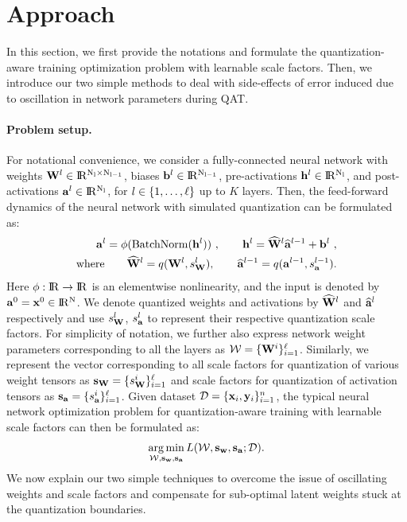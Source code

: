 
\section{Approach}
\label{sec:approach}
In this section, we first provide the notations and formulate the quantization-aware training optimization problem with learnable scale factors. Then, we introduce our two simple methods to deal with side-effects of error induced due to oscillation in network parameters during \acrshort{QAT}. 
\vspace{-2ex}

\paragraph{Problem setup.} For notational convenience, we consider a fully-connected neural network with weights ${{\mathbf{W}}^l\in\rm I\!R^{N_l\times N_{l-1}}}$, biases ${\mathbf{b}}^l\in\rm I\!R^{N_{l-1}}$, pre-activations ${\mathbf{h}}^l\in\rm I\!R^{N_l}$, and post-activations ${\mathbf{a}}^l\in\rm I\!R^{N_l}$, for $l \in \{1,\ldots, \ell\}$ up to $K$ layers. Then, the feed-forward dynamics of the neural network with simulated quantization can be formulated as:
\begin{align}
\label{eq:forward-qat}
{\mathbf{a}}^l = \phi(\operatorname{BatchNorm}({\mathbf{h}}^l))\ ,\qquad {\mathbf{h}}^l = \widehat{{\mathbf{W}}}^l\widehat{{\mathbf{a}}}^{l-1} + {\mathbf{b}}^l\ ,\\
\mbox{where}\qquad \widehat{{\mathbf{W}}}^l = q({\mathbf{W}}^l, s_{{\mathbf{W}}}^l), \qquad  \widehat{{\mathbf{a}}}^{l-1} = q({\mathbf{a}}^{l-1}, s_{{\mathbf{a}}}^{l-1}).\nonumber
\end{align}
Here $\phi: \rm I\!R \to\rm I\!R$ is an elementwise nonlinearity, and the input is denoted by ${\mathbf{a}}^0={\mathbf{x}}^0\in\rm I\!R^N$. We denote quantized weights and activations by $\widehat{{\mathbf{W}}}^l$ and $\widehat{{\mathbf{a}}}^l$ respectively and use $s_{\mathbf{W}}^l$, $s_{\mathbf{a}}^{l}$ to represent their respective quantization scale factors. For simplicity of notation, we further also express network weight parameters corresponding to all the layers as $\mathcal{W}=\{{\mathbf{W}}^i\}_{i=1}^\ell$. Similarly, we represent the vector corresponding to all scale factors for quantization of various weight tensors as ${\mathbf{s}}_{{\mathbf{W}}} = \{s_{{\mathbf{W}}}^i\}_{i=1}^\ell$ and scale factors for quantization of activation tensors as ${\mathbf{s}}_{{\mathbf{a}}} = \{s_{{\mathbf{a}}}^i\}_{i=1}^\ell$. Given dataset $\mathcal{D} = \{{\mathbf{x}}_i, {\mathbf{y}}_i\}_{i=1}^n$, the typical neural network optimization problem for quantization-aware training with learnable scale factors can then be formulated as:
\begin{equation}\label{eq:qat_nn}
    \operatorname*{arg\,min}_{\mathcal{W,{\mathbf{s}}_{{\mathbf{w}}}, {\mathbf{s}}_{{\mathbf{a}}}}}L(\mathcal{W}, {\mathbf{s}}_{{\mathbf{w}}}, {\mathbf{s}}_{{\mathbf{a}}};\mathcal{D}).
\end{equation}
We now explain our two simple techniques to overcome the issue of oscillating weights and scale factors and compensate for sub-optimal latent weights stuck at the quantization boundaries.
